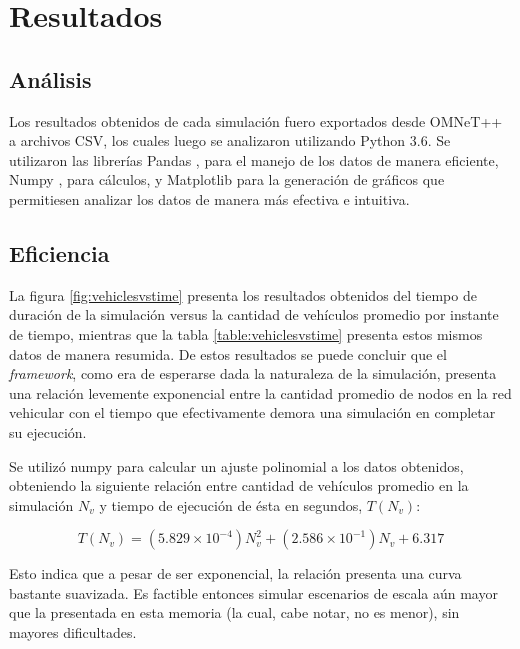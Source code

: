 \section{Resultados}\label{sec:results}

\subsection{Análisis}

Los resultados obtenidos de cada simulación fuero exportados desde OMNeT++ a archivos CSV, los cuales luego se analizaron utilizando Python 3.6.
Se utilizaron las librerías Pandas \autocite{pandas}, para el manejo de los datos de manera eficiente, Numpy \autocite{numpy}, para cálculos, y Matplotlib \autocite{matplotlib} para la generación de gráficos que permitiesen analizar los datos de manera más efectiva e intuitiva.

\subsection{Eficiencia}

La figura \ref{fig:vehiclesvstime} presenta los resultados obtenidos del tiempo de duración de la simulación versus la cantidad de vehículos promedio por instante de tiempo, mientras que la tabla \ref{table:vehiclesvstime} presenta estos mismos datos de manera resumida. De estos resultados se puede concluir que el \emph{framework}, como era de esperarse dada la naturaleza de la simulación, presenta una relación levemente exponencial entre la cantidad promedio de nodos en la red vehicular con el tiempo que efectivamente demora una simulación en completar su ejecución.

Se utilizó numpy para calcular un ajuste polinomial a los datos obtenidos, obteniendo la siguiente relación entre cantidad de vehículos promedio en la simulación $N_{v}$ y tiempo de ejecución de ésta en segundos, $T(N_{v})$:

\[ T(N_{v}) = (5.829 \times 10^{-4})N_{v}^{2} + (2.586 \times 10^{-1})N_{v} + 6.317 \]

Esto indica que a pesar de ser exponencial, la relación presenta una curva bastante suavizada. Es factible entonces simular escenarios de escala aún mayor que la presentada en esta memoria (la cual, cabe notar, no es menor), sin mayores dificultades.

